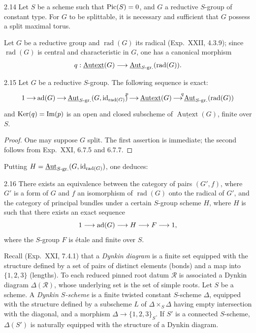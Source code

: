 \begin{corollary}{2.14}\label{XXIV.2.14}
Let $S$ be a scheme such that $\operatorname{Pic}(S)=0$, and $G$ a reductive $S$-group of constant type. For $G$ to be splittable, it is necessary and sufficient that $G$ possess a split maximal torus.
\end{corollary}
Let $G$ be a reductive group and $\operatorname{rad}(G)$ its radical (Exp.~XXII, 4.3.9); since $\operatorname{rad}(G)$ is central and characteristic in $G$, one has a canonical morphism
\[
q:\underline{\operatorname{Autext}}(G)\longrightarrow\underline{\operatorname{Aut}}_{S\text{-gr.}}(\operatorname{rad}(G)).
\]
\begin{proposition}{2.15}\label{XXIV.2.15}
Let $G$ be a reductive $S$-group. The following sequence is exact:
\[
\xymatrix@C=1.2em{1\ar[r]&\ad(G)\ar[r]&\underline{\Aut}_{S\text{-gr.}}(G,\mathrm{id}_{\operatorname{rad}(G)})\ar[r]^p&\underline{\operatorname{Autext}}(G)\ar[r]^q&\underline{\Aut}_{S\text{-gr.}}(\operatorname{rad}(G))}
\]
and $\operatorname{Ker}(q)=\operatorname{Im}(p)$ is an open and closed subscheme of $\underline{\operatorname{Autext}}(G)$, finite over $S$.
\end{proposition}
\begin{proof}
One may suppose $G$ split. The first assertion is immediate; the second follows from Exp.~XXI, 6.7.5 and 6.7.7.
\end{proof}
Putting $H=\underline{\operatorname{Aut}}_{S\text{-gr.}}(G,\mathrm{id}_{\operatorname{rad}(G)})$, one deduces:
\begin{corollary}{2.16}\label{XXIV.2.16}
There exists an equivalence between the category of pairs $(G',f)$, where $G'$ is a form of $G$ and $f$ an isomorphism of $\operatorname{rad}(G)$ onto the radical of $G'$, and the category of principal bundles under a certain $S$-group scheme $H$, where $H$ is such that there exists an exact sequence
\[
1\longrightarrow\operatorname{ad}(G)\longrightarrow H\longrightarrow F\longrightarrow1,
\]
where the $S$-group $F$ is étale and finite over $S$.
\end{corollary}

\label{XXIV.3.1}
Recall (Exp.~XXI, 7.4.1) that a \emph{Dynkin diagram} is a finite set equipped with the structure defined by a set of pairs of distinct elements (bonds) and a map into $\{1,2,3\}$ (lengths). To each reduced pinned root datum $\mathscr R$ is associated a Dynkin diagram $\Delta(\mathscr R)$, whose underlying set is the set of simple roots.
\label{XXIV.3.2}
Let $S$ be a scheme. A \emph{Dynkin $S$-scheme} is a finite twisted constant $S$-scheme $\Delta$, equipped with the structure defined by a subscheme $L$ of $\Delta\times_S\Delta$ having empty intersection with the diagonal, and a morphism $\Delta\to\{1,2,3\}_S$. If $S'$ is a connected $S$-scheme, $\Delta(S')$ is naturally equipped with the structure of a Dynkin diagram.

